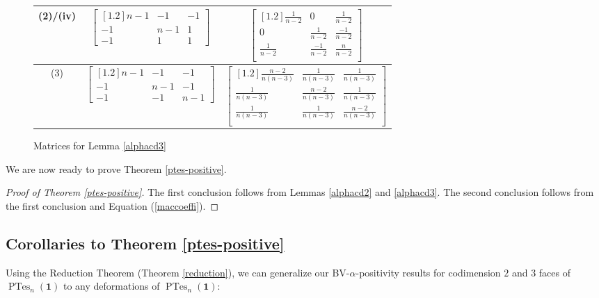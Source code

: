 \documentclass[12pt]{amsart}
\numberwithin{equation}{section}
\theoremstyle{definition}
\def\ptes{\operatorname{PTes}}
\begin{document}
{\begin{landscape}
\begin{figure}
\begin{tabular}{ | c | c | c |}
(2)/(iv) &
$\begin{bmatrix}[1.2]
   n-1 & -1 & -1 \\
   -1  & n-1& 1\\
   -1   & 1 & 1 
  \end{bmatrix}$& 
  $\begin{bmatrix}[1.2]
    \frac{1}{n-2} & 0 & \frac{1}{n-2}\\[1mm]
    0  & \frac{1}{n-2} & \frac{-1}{n-2}\\[1mm]
    \frac{1}{n-2} & \frac{-1}{n-2} & \frac{n}{n-2} \\[1mm]
  \end{bmatrix}$ 
  \rule{0pt}{2.5\normalbaselineskip} \\[1.8\normalbaselineskip]
\hline
(3) & 
$\begin{bmatrix}[1.2]
  n-1 & -1 & -1\\
  -1  & n-1& -1\\
  -1  & -1 &n-1
 \end{bmatrix}$ &
 $\begin{bmatrix}[1.2]
  \frac{n-2}{n(n-3)} & \frac{1}{n(n-3)} & \frac{1}{n(n-3)}\\[1mm]
  \frac{1}{n(n-3)} & \frac{n-2}{n(n-3)} & \frac{1}{n(n-3)}\\[1mm]
  \frac{1}{n(n-3)} & \frac{1}{n(n-3)} & \frac{n-2}{n(n-3)}\\[1mm]
 \end{bmatrix}$ 
 \rule{0pt}{2.5\normalbaselineskip} \\[1.8\normalbaselineskip]
\hline
\end{tabular}
\caption{Matrices for Lemma \ref{alphacd3}}
\label{fig:data3}
\end{figure}
\end{landscape}
}

We are now ready to prove Theorem \ref{ptes-positive}.

\begin{proof}[Proof of Theorem \ref{ptes-positive}]
The first conclusion follows from Lemmas \ref{alphacd2} and \ref{alphacd3}.
The second conclusion follows from the first conclusion and Equation (\ref{maccoeffi}). 
\end{proof}


\subsection{Corollaries to Theorem \ref{ptes-positive}}

Using the Reduction Theorem (Theorem \ref{reduction}), we can generalize our BV-$\alpha$-positivity results for codimension $2$ and $3$ faces of $\ptes_{n}(\boldsymbol{1})$ to any deformations of $\ptes_{n}(\boldsymbol{1})$:
\end{document}
